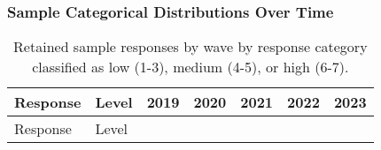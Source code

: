 \documentclass[
  single column]{article}
\begin{document}
\newpage{}

\subsubsection{Sample Categorical Distributions Over
Time}\label{sample-categorical-distributions-over-time}

\begin{longtable}[]{@{}
  >{\raggedright\arraybackslash}p{}
  >{\raggedright\arraybackslash}p{}
  >{\raggedright\arraybackslash}p{}
  >{\raggedright\arraybackslash}p{}
  >{\raggedright\arraybackslash}p{}
  >{\raggedright\arraybackslash}p{}
  >{\raggedright\arraybackslash}p{}@{}}
\caption{Retained sample responses by wave by response category
classified as low (1-3), medium (4-5), or high
(6-7).}\label{tbl-sample-cat}\tabularnewline
\toprule\noalign{}
\begin{minipage}[b]{\linewidth}\raggedright
Response
\end{minipage} & \begin{minipage}[b]{\linewidth}\raggedright
Level
\end{minipage} & \begin{minipage}[b]{\linewidth}\raggedright
2019
\end{minipage} & \begin{minipage}[b]{\linewidth}\raggedright
2020
\end{minipage} & \begin{minipage}[b]{\linewidth}\raggedright
2021
\end{minipage} & \begin{minipage}[b]{\linewidth}\raggedright
2022
\end{minipage} & \begin{minipage}[b]{\linewidth}\raggedright
2023
\end{minipage} \\
\midrule\noalign{}
\endfirsthead
\toprule\noalign{}
\begin{minipage}[b]{\linewidth}\raggedright
Response
\end{minipage} & \begin{minipage}[b]{\linewidth}\raggedright
Level
\end{minipage} & \begin{minipage}[b]{\linewidth}\raggedright

\end{minipage}
\end{longtable}
\end{document}
